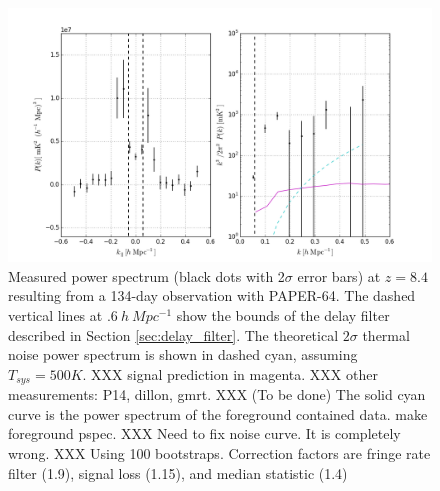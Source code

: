 \documentclass[twocolumn,numberedappendix]{emulateapj} \shorttitle{PSA64}
\begin{document}
\begin{figure}[h!]\centering
\includegraphics[width=2\columnwidth,height=1.2\columnwidth]{plots/pk_k3pk.png}
\caption{
Measured power spectrum (black dots with 2$\sigma$ error bars)
at $z=8.4$ resulting from a 134-day observation with PAPER-64.
The dashed
vertical lines at $.6\ h\ Mpc^{-1}$ show the bounds of the
delay filter described in Section \ref{sec:delay_filter}. The theoretical
$2\sigma$ thermal noise power spectrum is shown in dashed cyan, assuming
$T_{sys}=500K$.
XXX signal prediction in magenta.
XXX other measurements: P14, dillon, gmrt.
XXX (To be done) The solid cyan curve is the power spectrum of the
foreground contained data. make foreground pspec.
XXX Need to fix noise curve. It is completely wrong.
XXX Using 100 bootstraps. Correction factors are fringe rate
filter (1.9), signal loss (1.15), and median statistic (1.4)}
\label{fig:final_pspec}
\end{figure}
\end{document}
